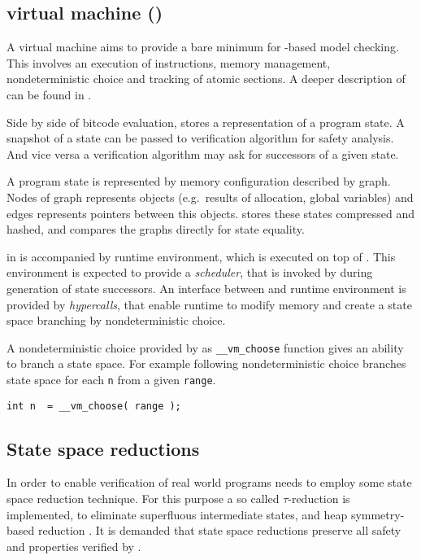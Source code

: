 \subsection{\DIVINE virtual machine (\DIVM)}

A \DIVINE virtual machine aims to provide a bare minimum for \LLVM-based
model checking. This involves an execution of instructions, memory management,
nondeterministic choice and tracking of atomic sections. A deeper description of
\DIVM can be found in \cite{RockaiCB17}.

Side by side of \LLVM bitcode evaluation, \DIVM stores a representation of a
program state. A snapshot of a state can be passed to verification algorithm
for safety analysis. And vice versa a verification algorithm may ask \DIVM for
successors of a given state.

A program state is represented by memory configuration described by graph.
Nodes of graph represents objects (e.g.~results of allocation, global
variables) and edges represents pointers between this objects.
\DIVM stores these states compressed and hashed, and compares the graphs
directly for state equality.

\DIVM in \DIVINE is accompanied by runtime environment, which is executed on top
of \DIVM. This environment is expected to provide a \emph{scheduler}, that is invoked
by \DIVM during generation of state successors. An interface between \DIVM and
runtime environment is provided by \emph{hypercalls}, that enable runtime to modify
memory and create a state space branching by nondeterministic choice.

\begin{example}
A nondeterministic choice provided by \DIVM as \texttt{\_\_vm\_choose} function
gives an ability to branch a state space. For example following nondeterministic
choice branches state space for each \texttt{n} from a given \texttt{range}.

\begin{verbatim}
int n  = __vm_choose( range );
\end{verbatim}

\end{example}
\subsection{State space reductions}

In order to enable verification of real world programs \DIVINE needs to employ
some state space reduction technique. For this purpose a so called
$\tau$-reduction is implemented, to eliminate superfluous intermediate states,
and heap symmetry-based reduction \cite{Rockai13} \cite{RockaiCB17}. It is demanded
that state space reductions preserve all safety and \LTL properties verified
by \DIVINE.

